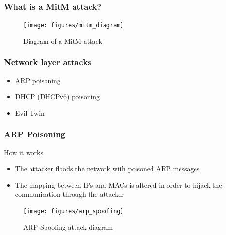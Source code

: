 \documentclass{beamer}
\begin{document}
\begin{frame}
  \frametitle{What is a MitM attack?}
  \begin{figure}
  \texttt{[image: figures/mitm\_diagram]}
  \caption*{Diagram of a MitM attack}
  \end{figure}

\end{frame}


\begin{frame}
  \frametitle{Network layer attacks}
  \begin{block}{}
    \begin{itemize}
      \item ARP poisoning
      \item DHCP (DHCPv6) poisoning
      \item Evil Twin
    \end{itemize}
  \end{block}

\end{frame}

\begin{frame}
  \frametitle{ARP Poisoning}
  \begin{block}{How it works}
  \begin{itemize}
    \item The attacker floods the network with poisoned ARP messages
    \item The mapping between IPs and MACs is altered in order to hijack the communication through the attacker
  \end{itemize}
\end{block}
  \begin{figure}
    \texttt{[image: figures/arp\_spoofing]}
    \caption*{ARP Spoofing attack diagram}
  \end{figure}
\end{frame}
\end{document}
